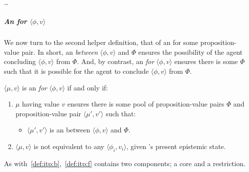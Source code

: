\begin{note}
  \dots
\end{note}

\subparagraph*{An \itp{} for \(\langle \phi,v \rangle\)}

\begin{note}
  We now turn to the second helper definition, that of an  for some proposition-value pair.
  In short, an  \emph{between} \(\langle \phi,v \rangle\) and \(\Phi\) ensures the possibility of the agent concluding \(\langle \phi,v \rangle\) from \(\Phi\).
  And, by contrast, an  \emph{for} \(\langle \phi,v \rangle\) ensures there is some \(\Phi\) such that it is possible for the agent to conclude \(\langle \phi,v \rangle\) from \(\Phi\).
\end{note}

\begin{note}
  \begin{definition}
    \label{def:itp:f}
    \(\langle \mu,v \rangle\) is an \itp{} \emph{for} \(\langle \phi,v \rangle\) if and only if:
    \begin{enumerate}[label=\arabic*., ref=\named{I.f:\arabic*}]
    \item
      \label{def:itp:f:pR}
      \(\mu\) having value \(v\) ensures there is some pool of proposition-value pairs \(\Phi\) and proposition-value pair \(\langle \mu',v' \rangle\) such that:
      \begin{itemize}
      \item
        \(\langle \mu',v' \rangle\) is an \itp{} between \(\langle \phi,v \rangle\) and \(\Phi\).
      \end{itemize}
    \item
      \label{def:itp:f:distinct}
      \(\langle \mu,v \rangle\) is not equivalent to any \(\langle \phi_{i},v_{i} \rangle\), given \vAgent{}'s present epistemic state.
    \end{enumerate}
    \vspace{-\baselineskip}
  \end{definition}
\end{note}

\begin{note}
  As with~\autoref{def:itp:b},~\autoref{def:itp:f} contains two components; a core and a restriction.
\end{note}

